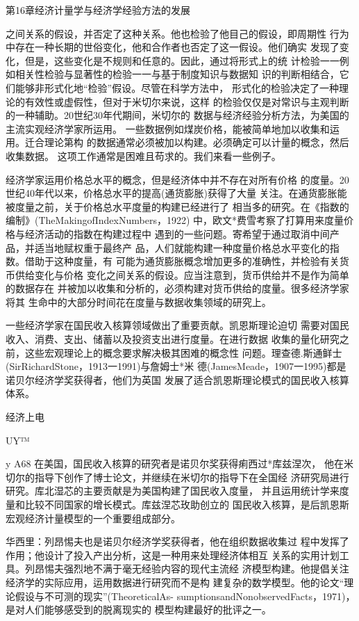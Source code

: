 第16章经济计量学与经济学经验方法的发展


之间关系的假设，并否定了这种关系。他也检验了他目己的假设，即周期性
行为中存在一种长期的世俗变化，他和合作者也否定了这一假设。他们确实
发现了变化，但是，这些变化是不规则和任意的。因此，通过将形式上的统
计检验一一例如相关性检验与显著性的检验一一与基于制度知识与数据知
识的判断相结合，它们能够非形式化地“检验”假设。尽管在科学方法中，
形式化的检验决定了一种理论的有效性或虚假性，但对于米切尔来说，这样
的检验仅仅是对常识与主观判断的一种辅助。20世纪30年代期间，米切尔的
数据与经济经验分析方法，为美国的主流实观经济学家所运用。
一些数据例如煤炭价格，能被简单地加以收集和运用。迁合理论第构
的数据通常必须被加以构建。必须确定可以计量的概念，然后收集数据。
这项工作通常是困难且苟求的。我们来看一些例子。

经济学家运用价格总水平的概念，但是经济体中并不存在对所有价格
的度量。20世纪40年代以来，价格总水平的提高(通货膨胀)获得了大量
关注。在通货膨胀能被度量之前，关于价格总水平度量的构建已经进行了
相当多的研究。在《指数的编制》(TheMakingofIndexNumbers，1922)
中，欧文*费雪考察了打算用来度量价格与经济活动的指数在构建过程中
遇到的一些问题。寄希望于通过取消中间产品，并适当地赋权重于最终产
品，人们就能构建一种度量价格总水平变化的指数。借助于这种度量，有
可能为通货膨胀概念增加更多的准确性，并检验有关货币供给变化与价格
变化之间关系的假设。应当注意到，货币供给并不是作为简单的数据存在
并被加以收集和分析的，必须构建对货币供给的度量。很多经济学家将其
生命中的大部分时间花在度量与数据收集领域的研究上。

一些经济学家在国民收入核算领域做出了重要贡献。凯恩斯理论迫切
需要对国民收入、消费、支出、储蓄以及投资支出进行度量。在进行数据
收集的量化研究之前，这些宏观理论上的概念要求解决极其困难的概念性
问题。理查德.斯通鲜士(SirRichardStone，1913一1991)与詹姆士*米
德(JamesMeade，1907一1995)都是诺贝尔经济学奖获得者，他们为英国
发展了适合凯恩斯理论模式的国民收入核算体系。


经济上电

UY™

y
A68
在美国，国民收入核算的研究者是诺贝尔奖获得痢西过*库兹涅次，
他在米切尔的指导下创作了博士论文，并继续在米切尔的指导下在全国经
济研究局进行研究。库北湿芯的主要贡献是为美国构建了国民收入度量，
并且运用统计学来度量和比较不同国家的增长模式。库兹涅芯玫助创立的
国民收入核算，是后凯恩斯宏观经济计量模型的一个重要组成部分。

华西里：列昂惕夫也是诺贝尔经济学奖获得者，他在组织数据收集过
程中发挥了作用；他设计了投入产出分析，这是一种用来处理经济体相互
关系的实用计划工具。列昂惕夫强烈地不满于毫无经验内容的现代主流经
济模型构建。他提倡关注经济学的实际应用，运用数据进行研究而不是构
建复杂的数学模型。他的论文“理论假设与不可测的现实”(TheoreticalAs-
sumptionsandNonobservedFacts，1971)，是对人们能够感受到的脱离现实的
模型构建最好的批评之一。

